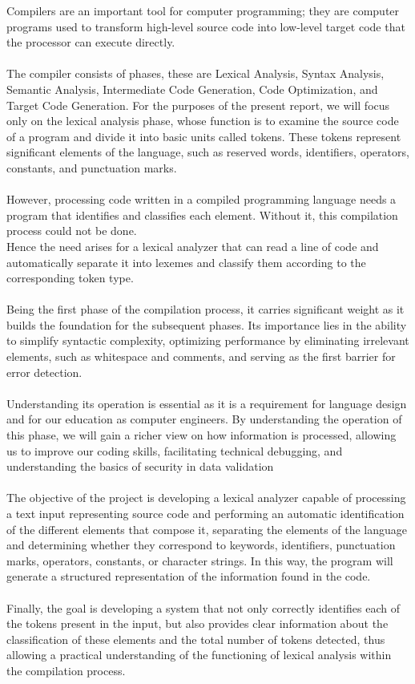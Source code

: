 \documentclass[letterpaper,12pt,oneside]{article}
\begin{document}
Compilers are an important tool for computer programming; they are computer programs used to transform high-level source code into low-level target code that the processor can execute directly. 
\\ \\
The compiler consists of phases, these are Lexical Analysis, Syntax Analysis, Semantic Analysis, Intermediate Code Generation, Code Optimization, and Target Code Generation. For the purposes of the present report, we will focus only on the lexical analysis phase, whose function is to examine the source code of a program and divide it into basic units called tokens. These tokens represent significant elements of the language, such as reserved words, identifiers, operators, constants, and punctuation marks.
\\ \\
However, processing code written in a compiled programming language needs a program that identifies and classifies each element. Without it, this compilation process could not be done.
\\ 
Hence the need arises for a lexical analyzer that can read a line of code and automatically separate it into lexemes and classify them according to the corresponding token type.
\\ \\
Being the first phase of the compilation process, it carries significant weight as it builds the foundation for the subsequent phases. Its importance lies in the ability to simplify syntactic complexity, optimizing performance by eliminating irrelevant elements, such as whitespace and comments, and serving as the first barrier for error detection.
\\ \\
Understanding its operation is essential as it is a requirement for language design and for our education as computer engineers. By understanding the operation of this phase, we will gain a richer view on how information is processed, allowing us to improve our coding skills, facilitating technical debugging, and understanding the basics of security in data validation
\\ \\
The objective of the project is developing a lexical analyzer capable of processing a text input representing source code and performing an automatic identification of the different elements that compose it, separating the elements of the language and determining whether they correspond to keywords, identifiers, punctuation marks, operators, constants, or character strings. In this way, the program will generate a structured representation of the information found in the code.
\\ \\
Finally, the goal is developing a system that not only correctly identifies each of the tokens present in the input, but also provides clear information about the classification of these elements and the total number of tokens detected, thus allowing a practical understanding of the functioning of lexical analysis within the compilation process.
\end{document}
